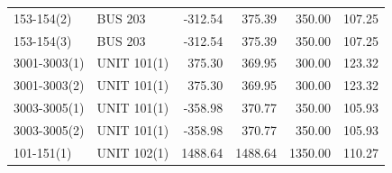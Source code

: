 \documentclass[10pt]{report}
\begin{document}
\begin{table}[H]
{\begin{tabular}{llrrrr}
153-154(2) & BUS 203 & -312.54 & 375.39 & 350.00 & 107.25 \\
153-154(3) & BUS 203 & -312.54 & 375.39 & 350.00 & 107.25 \\
3001-3003(1) & UNIT 101(1) & 375.30 & 369.95 & 300.00 & 123.32 \\
3001-3003(2) & UNIT 101(1) & 375.30 & 369.95 & 300.00 & 123.32 \\
3003-3005(1) & UNIT 101(1) & -358.98 & 370.77 & 350.00 & 105.93 \\
3003-3005(2) & UNIT 101(1) & -358.98 & 370.77 & 350.00 & 105.93 \\
101-151(1) & UNIT 102(1) & 1488.64 & 1488.64 & 1350.00 & 110.27 \\
\bottomrule
\end{tabular}}
\end{table}
\end{document}
